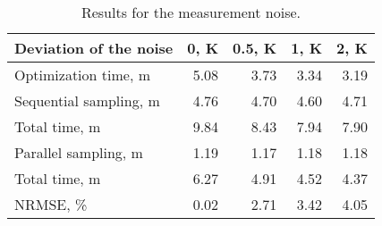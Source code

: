 \begin{table}[h]
  \centering
  \caption{Results for the measurement noise.}
  \begin{tabular*}{1\linewidth}{l@{\hskip 5.5em}r@{\hskip 2em}r@{\hskip 2em}r@{\hskip 2em}r}
    \toprule
    Deviation of the noise & 0, K & 0.5, K & 1, K & 2, K \\
    \midrule
    \midrule
    Optimization time, m     & 5.08 & 3.73 & 3.34 & 3.19 \\
    \midrule
    Sequential sampling, m   & 4.76 & 4.70 & 4.60 & 4.71 \\
    Total time, m            & 9.84 & 8.43 & 7.94 & 7.90 \\
    \midrule
    Parallel sampling, m     & 1.19 & 1.17 & 1.18 & 1.18 \\
    Total time, m            & 6.27 & 4.91 & 4.52 & 4.37 \\
    \midrule
    NRMSE, \%                & 0.02 & 2.71 & 3.42 & 4.05 \\
    \bottomrule
  \end{tabular*}
  \vspace{-1em}
\end{table}
